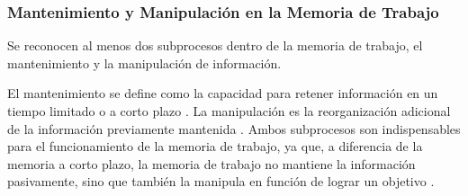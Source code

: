 \documentclass[12pt,letterpaper,final]{article}
\let\cite\cite %
\begin{document}
\subsubsection{Mantenimiento y Manipulación en la Memoria de Trabajo}

Se reconocen al menos dos subprocesos dentro de la memoria de trabajo, el mantenimiento y la manipulación de información.

El mantenimiento se define como la capacidad para retener información en un tiempo limitado o a corto plazo \cite{Eriksson2015}. La manipulación es la reorganización adicional de la información previamente mantenida \cite{Veltman2003}. Ambos subprocesos son indispensables para el funcionamiento de la memoria de trabajo, ya que, a diferencia de la memoria a corto plazo, la memoria de trabajo no mantiene la información pasivamente, sino que también la manipula en función de lograr un objetivo \cite{Dehn2008,DEsposito2015}.


\end{document}
